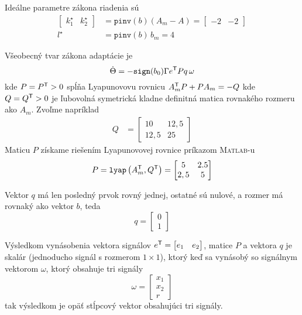\documentclass[a4paper, 10pt, ]{article}
\begin{document}
Ideálne parametre zákona riadenia sú
\begin{align}
    \begin{bmatrix} k_1^\star & k_2^\star \end{bmatrix}
    &=
    \texttt{pinv}(b) \left( A_m - A \right) = \begin{bmatrix} -2 & -2 \end{bmatrix}
    \\
    l^\star &= \texttt{pinv}(b) \, b_m = 4
\end{align}


Všeobecný tvar zákona adaptácie je
\begin{equation}
	\dot \Theta = - \texttt{sign}(b_0) \Gamma e^{\mathsf{T}} P q \, \omega
\end{equation}
kde $P = P^{\mathsf{T}} > 0$ spĺňa Lyapunovovu rovnicu $ A_m^{\mathsf{T}} P + P A_m = - Q$ kde $Q = Q^{\mathsf{T}} > 0$ je ľubovolná symetrická kladne definitná matica rovnakého rozmeru ako $A_m$. Zvoľme napríklad
\begin{align*}
	 Q &= \begin{bmatrix} 10 & 12,5\\ 12,5& 25 \end{bmatrix}
\end{align*}
Maticu $P$ získame riešením Lyapunovovej rovnice príkazom \textsc{Matlab}-u
\begin{equation}
	P = \texttt{lyap} \left( A_m^{\mathsf{T}}, Q^{\mathsf{T}} \right) = \begin{bmatrix} 5 &  2.5 \\   2,5  &  5 \end{bmatrix}
\end{equation}

Vektor $q$ má len posledný prvok rovný jednej, ostatné sú nulové, a rozmer má rovnaký ako vektor $b$, teda
\begin{equation}
	q = \begin{bmatrix} 0 \\ 1 \end{bmatrix}
\end{equation}

Výsledkom vynásobenia vektora signálov $e^{\mathsf{T}} = \begin{bmatrix} e_1 & e_2 \end{bmatrix}$, matice $P$ a vektora $q$ je skalár (jednoducho signál s rozmerom $1 \times 1$), ktorý keď sa vynásobý so  signálnym vektorom $\omega$, ktorý obsahuje tri signály
\begin{equation}
	\omega = \begin{bmatrix} x_1 \\ x_2 \\ r \end{bmatrix}
\end{equation}
tak výsledkom je opäť stĺpcový vektor obsahujúci tri signály.
\end{document}
